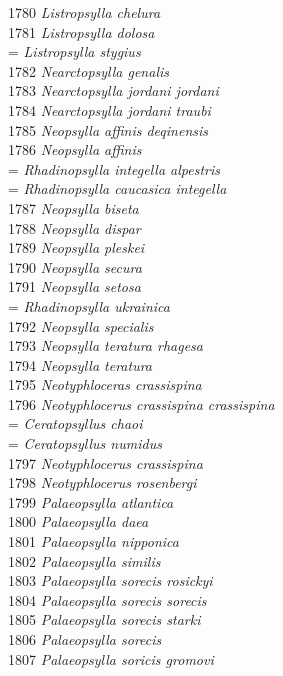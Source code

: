 \documentclass[
]{article}
\begin{document}
1780 \emph{Listropsylla chelura}\\
1781 \emph{Listropsylla dolosa}\\
= \emph{Listropsylla stygius}\\
1782 \emph{Nearctopsylla genalis}\\
1783 \emph{Nearctopsylla jordani jordani}\\
1784 \emph{Nearctopsylla jordani traubi}\\
1785 \emph{Neopsylla affinis deqinensis}\\
1786 \emph{Neopsylla affinis}\\
= \emph{Rhadinopsylla integella alpestris}\\
= \emph{Rhadinopsylla caucasica integella}\\
1787 \emph{Neopsylla biseta}\\
1788 \emph{Neopsylla dispar}\\
1789 \emph{Neopsylla pleskei}\\
1790 \emph{Neopsylla secura}\\
1791 \emph{Neopsylla setosa}\\
= \emph{Rhadinopsylla ukrainica}\\
1792 \emph{Neopsylla specialis}\\
1793 \emph{Neopsylla teratura rhagesa}\\
1794 \emph{Neopsylla teratura}\\
1795 \emph{Neotyphloceras crassispina}\\
1796 \emph{Neotyphlocerus crassispina crassispina}\\
= \emph{Ceratopsyllus chaoi}\\
= \emph{Ceratopsyllus numidus}\\
1797 \emph{Neotyphlocerus crassispina}\\
1798 \emph{Neotyphlocerus rosenbergi}\\
1799 \emph{Palaeopsylla atlantica}\\
1800 \emph{Palaeopsylla daea}\\
1801 \emph{Palaeopsylla nipponica}\\
1802 \emph{Palaeopsylla similis}\\
1803 \emph{Palaeopsylla sorecis rosickyi}\\
1804 \emph{Palaeopsylla sorecis sorecis}\\
1805 \emph{Palaeopsylla sorecis starki}\\
1806 \emph{Palaeopsylla sorecis}\\
1807 \emph{Palaeopsylla soricis gromovi}\\
\end{document}
